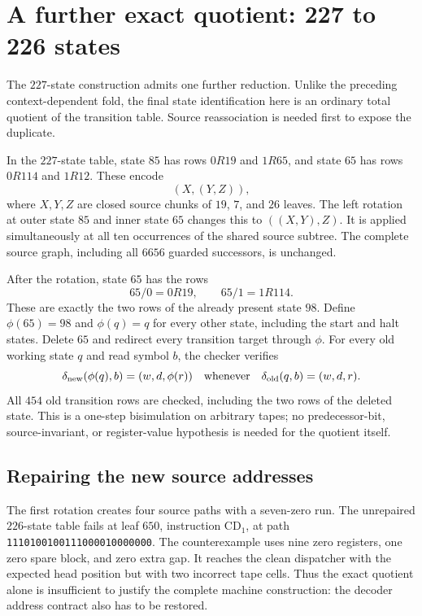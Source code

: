 \section{A further exact quotient: 227 to 226 states}
\label{sec:k226-duplicate}

The $227$-state construction admits one further reduction.  Unlike the
preceding context-dependent fold, the final state identification here is
an ordinary total quotient of the transition table.  Source
reassociation is needed first to expose the duplicate.

In the $227$-state table, state $85$ has rows $0R19$ and $1R65$,
and state $65$ has rows $0R114$ and $1R12$.  These encode
\[
 (X,(Y,Z)),
\]
where $X,Y,Z$ are closed source chunks of $19$, $7$, and $26$ leaves.
The left rotation at outer state $85$ and inner state $65$ changes this
to $((X,Y),Z)$.  It is applied simultaneously at all ten occurrences
of the shared source subtree.  The complete source graph, including
all $6656$ guarded successors, is unchanged.

After the rotation, state $65$ has the rows
\[
 65/0=0R19,\qquad65/1=1R114.
\]
These are exactly the two rows of the already present state $98$.
Define $\phi(65)=98$ and $\phi(q)=q$ for every other state, including
the start and halt states.  Delete $65$ and redirect every transition
target through $\phi$.  For every old working state $q$ and read symbol
$b$, the checker verifies
\[
 \delta_{\rm new}(\phi(q),b)
   =(w,d,\phi(r))
 \quad\text{whenever}\quad
 \delta_{\rm old}(q,b)=(w,d,r).
\]
All $454$ old transition rows are checked, including the two rows of
the deleted state.  This is a one-step bisimulation on arbitrary tapes;
no predecessor-bit, source-invariant, or register-value hypothesis is
needed for the quotient itself.

\subsection{Repairing the new source addresses}

The first rotation creates four source paths with a seven-zero run.
The unrepaired $226$-state table fails at leaf $650$, instruction
$\mathrm{CD}_1$, at path
\texttt{1110100100111000010000000}.
The counterexample uses nine zero registers, one zero spare block, and
zero extra gap.  It reaches the clean dispatcher with the expected head
position but with two incorrect tape cells.  Thus the exact quotient
alone is insufficient to justify the complete machine construction:
the decoder address contract also has to be restored.

